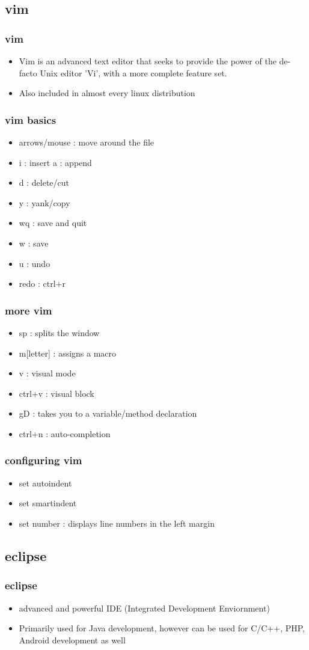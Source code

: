 \documentclass[hyperref={pdfpagelabels=false}]{beamer}
\begin{document}
	\subsection{vim}
		\frame
		{
		    \frametitle{vim}
		    \begin{itemize}
		    \item{Vim is an advanced text editor that seeks to provide the power of the de-facto Unix editor 'Vi', with a more complete feature set.}
		    \item{Also included in almost every linux distribution}
		    \end{itemize}
		}
		\frame
		{
		    \frametitle{vim basics}
		    \begin{itemize}
		    \item{arrows/mouse : move around the file}
		    \item{i : insert   a : append}
		    \item{d : delete/cut}
		    \item{y : yank/copy}
		    \item{wq : save and quit}
		    \item{w : save}
		    \item{u : undo}
		    \item{redo : ctrl+r}
		    \end{itemize}
		}
		\frame
		{
		    \frametitle{more vim}
		    \begin{itemize}
		    \item{sp : splits the window}
		    \item{m[letter] : assigns a macro}
		    \item{v : visual mode}
		    \item{ctrl+v : visual block}
		    \item{gD : takes you to a variable/method declaration}
		    \item{ctrl+n : auto-completion}
		    \end{itemize}
		}
		\frame
		{
		    \frametitle{configuring vim}
		    \begin{itemize}
		    \item{set autoindent}
		    \item{set smartindent}
		    \item{set number : displays line numbers in the left margin}
		    \end{itemize}
		}
	\subsection{eclipse}
		\frame
		{
		    \frametitle{eclipse}
		    \begin{itemize}
		    \item{advanced and powerful IDE (Integrated Development Enviornment)}
		    \item{Primarily used for Java development, however can be used for C/C++, PHP, Android development as well}
		    \end{itemize}
		}
\end{document}
